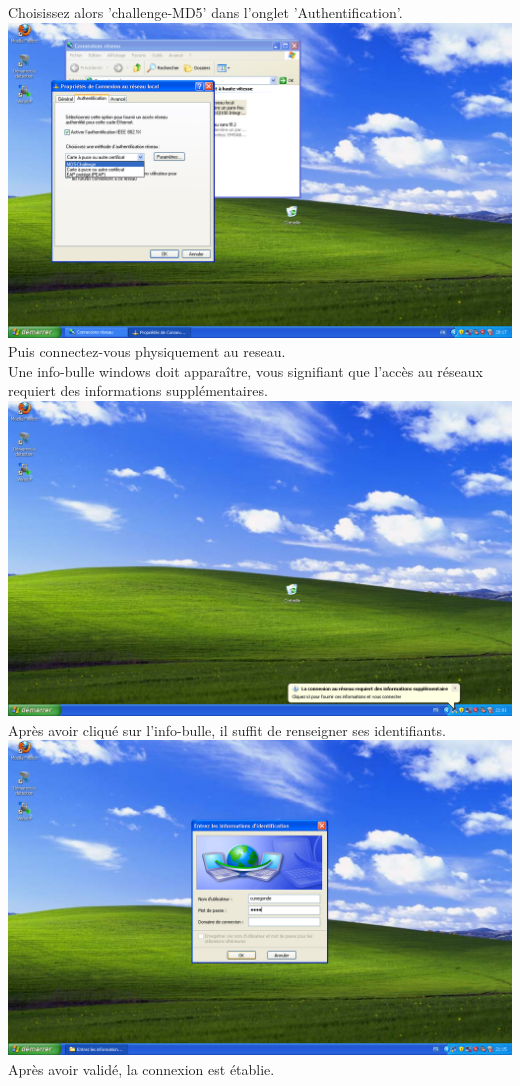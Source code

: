 Choisissez alors 'challenge-MD5' dans l'onglet 'Authentification'.\\
\includegraphics[width=\screenShotSize{}]{imgUser/md5-challenge.PNG}\\
Puis connectez-vous physiquement au reseau.\\
Une info-bulle windows doit apparaître, vous signifiant que l'accès au réseaux requiert des informations supplémentaires.\\
\includegraphics[width=\screenShotSize{}]{imgUser/md5Info.PNG}\\
Après avoir cliqué sur l'info-bulle, il suffit de renseigner ses identifiants.\\
\includegraphics[width=\screenShotSize{}]{imgUser/credentials.PNG}\\
Après avoir validé, la connexion est établie.



